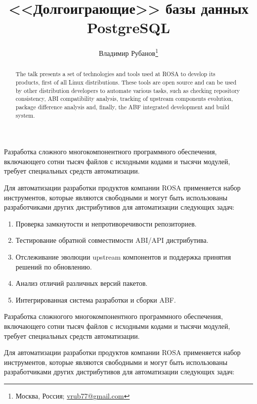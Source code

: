 \documentclass[10pt, a5paper]{article}
\begin{document}
\title{<<Долгоиграющие>> базы данных PostgreSQL}%

\author{Владимир Рубанов\footnote{Москва, Россия; \url{vrub77@gmail.com}}}
\maketitle

\begin{abstract}
The talk presents a set of technologies and tools used at ROSA to develop its products, first of all Linux distributions. These tools are open source and can be used by other distribution developers to automate various tasks, such as checking repository consistency, ABI compatibility analysis, tracking of upstream components evolution, package difference analysis and, finally, the ABF integrated development and build system.
\end{abstract}

Разработка сложного многокомпонентного программного обеспечения, включающего сотни тысяч файлов с исходными кодами и тысячи модулей, требует специальных средств автоматизации.

Для автоматизации разработки продуктов компании ROSA применяется набор инструментов, которые являются свободными и могут быть использованы разработчиками других дистрибутивов для автоматизации следующих задач:

\begin{enumerate}
  \item Проверка замкнутости и непротиворечивости репозиториев.
  \item Тестирование обратной совместимости ABI/API дистрибутива.
  \item Отслеживание эволюции upstream компонентов и поддержка принятия решений по обновлению.
  \item Анализ отличий различных версий пакетов.
  \item Интегрированная система разработки и сборки ABF.
\end{enumerate}

Разработка сложногого многокомпонентного программного обеспечения, включающего сотни тысяч файлов с исходными кодами и тысячи модулей, требует специальных средств автоматизации.

Для автоматизации разработки продуктов компании ROSA применяется набор инструментов, которые являются свободными и могут быть использованы разработчиками других дистрибутивов для автоматизации следующих задач:
\end{document}
